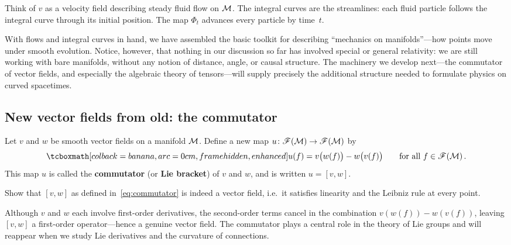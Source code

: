 \begin{intuition}
  Think of $v$ as a velocity field describing steady fluid flow on
  $\mathcal{M}$.  The integral curves are the streamlines: each fluid
  particle follows the integral curve through its initial position.
  The map $\Phi_t$ advances every particle by time~$t$.
\end{intuition}

With flows and integral curves in hand, we have assembled the
basic toolkit for describing ``mechanics on manifolds''---how
points move under smooth evolution.  Notice, however, that nothing
in our discussion so far has involved special or general
relativity: we are still working with bare manifolds, without any
notion of distance, angle, or causal structure.  The machinery we
develop next---the commutator of vector fields, and especially the
algebraic theory of tensors---will supply precisely the additional
structure needed to formulate physics on curved spacetimes.

\subsection{New vector fields from old: the commutator}%
\label{sec:commutator}

\begin{definition}\label{def:commutator}
  Let $v$ and $w$ be smooth vector fields on a manifold $\mathcal{M}$.
  Define a new map $u\colon\mathscr{F}(\mathcal{M})\to\mathscr{F}(\mathcal{M})$ by
  \begin{equation}\label{eq:commutator}
    \eqbox{u(f) = v\bigl(w(f)\bigr) - w\bigl(v(f)\bigr)}
    \qquad\text{for all } f\in\mathscr{F}(\M)\,.
  \end{equation}
  This map $u$ is called the \textbf{commutator} (or \textbf{Lie
  bracket}) of $v$ and $w$, and is written $u = [v,w]$.
\end{definition}

\begin{exercise}\label{ex:commutator-vf}
  Show that $[v,w]$ as defined in~\eqref{eq:commutator} is
  indeed a vector field, i.e.\ it satisfies linearity and the
  Leibniz rule at every point.
\end{exercise}

\begin{remark}
  Although $v$ and $w$ each involve first-order derivatives, the
  second-order terms cancel in the combination $v(w(f))-w(v(f))$,
  leaving $[v,w]$ a first-order operator---hence a genuine vector
  field.  The commutator plays a central role in the theory of Lie
  groups and will reappear when we study Lie derivatives and the
  curvature of connections.
\end{remark}

